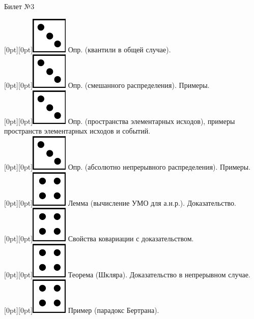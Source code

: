 \documentclass[10pt]{article}
\begin{document}
\begin{center} {\Large Билет №3} \end{center} 

\raisebox{-1pt}[0pt][0pt]{\includegraphics[width=0.02\linewidth]{3.png}}   Опр. (квантили в общей случае). \\

\raisebox{-1pt}[0pt][0pt]{\includegraphics[width=0.02\linewidth]{3.png}} Опр. (смешанного распределения). Примеры. \\

\raisebox{-1pt}[0pt][0pt]{\includegraphics[width=0.02\linewidth]{3.png}} Опр. (пространства элементарных исходов), примеры пространств элементарных исходов и событий. \\

\raisebox{-1pt}[0pt][0pt]{\includegraphics[width=0.02\linewidth]{3.png}} Опр. (абсолютно непрерывного распределения). Примеры. \\

\raisebox{-1pt}[0pt][0pt]{\includegraphics[width=0.02\linewidth]{4.png}} Лемма (вычисление УМО для а.н.р.). Доказательство. \\

\raisebox{-1pt}[0pt][0pt]{\includegraphics[width=0.02\linewidth]{4.png}} Свойства ковариации с доказательством. \\

\raisebox{-1pt}[0pt][0pt]{\includegraphics[width=0.02\linewidth]{4.png}} Теорема (Шкляра). Доказательство в непрерывном случае. \\

\raisebox{-1pt}[0pt][0pt]{\includegraphics[width=0.02\linewidth]{4.png}} Пример (парадокс Бертрана). \\ 
\end{document}
